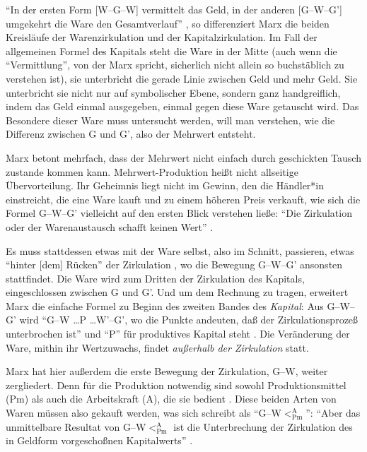 \documentclass[12pt,
               paper=a4,
               twoside=false,
               onehalfspacing,
               bibliography=totoc,
               toc=graduated,
               ]{scrartcl}
\newcommand{\pc}[2]{\parencite[#1]{#2}}
\newcommand{\vgl}[2]{\parencite[vgl.][#1]{#2}}
\newcommand{\gwg}{G--W--G'\xspace}
\newcommand{\gwapm}{G--W$<^{\text{A}}_{\text{Pm}}$\xspace}
\begin{document}

"`In der ersten Form [W--G--W] vermittelt das Geld, in der anderen
[G--W--G'] umgekehrt die Ware den Gesamtverlauf"' \pc{163}{kap}, so
differenziert Marx die beiden Kreisläufe der Warenzirkulation und der
Kapitalzirkulation. Im Fall der allgemeinen Formel des Kapitals steht
die Ware in der Mitte (auch wenn die "`Vermittlung"', von der Marx
spricht, sicherlich nicht allein so buchstäblich zu verstehen ist), sie
unterbricht die gerade Linie zwischen Geld und mehr Geld. Sie
unterbricht sie nicht nur auf symbolischer Ebene, sondern ganz
handgreiflich, indem das Geld einmal ausgegeben, einmal gegen diese
Ware getauscht wird. Das Besondere dieser Ware muss untersucht werden,
will man verstehen, wie die Differenz zwischen G und G', also der
Mehrwert entsteht.


Marx betont mehrfach, dass der Mehrwert nicht einfach durch
geschickten Tausch zustande kommen kann. Mehrwert-Produktion heißt
nicht allseitige Übervorteilung. Ihr Geheimnis liegt nicht im Gewinn,
den die Händler*in einstreicht, die eine Ware kauft und zu einem
höheren Preis verkauft, wie sich die Formel \gwg vielleicht auf den
ersten Blick verstehen ließe: "`Die Zirkulation oder der
Warenaustausch schafft keinen Wert"' \pc{178}{kap}.


Es muss stattdessen etwas mit der Ware selbst, also im Schnitt,
passieren, etwas "`hinter [dem] Rücken"' der Zirkulation
\pc{181}{kap}, wo die Bewegung \gwg ansonsten stattfindet. Die Ware
wird zum Dritten der Zirkulation des Kapitals, eingeschlossen zwischen
G und G'. Und um dem Rechnung zu tragen, erweitert Marx die einfache
Formel zu Beginn des zweiten Bandes des \emph{Kapital}: Aus \gwg wird
"`G--W \dots P \dots W'--G', wo die Punkte andeuten, daß der
Zirkulationsprozeß unterbrochen ist"' \pc{31}{kap2} und "`P"' für
produktives Kapital steht \vgl{34}{kap2}. Die Veränderung der Ware,
mithin ihr Wertzuwachs, findet \emph{außerhalb der Zirkulation} statt.


Marx hat hier außerdem die erste Bewegung der Zirkulation, G--W,
weiter zergliedert. Denn für die Produktion notwendig sind sowohl
Produktionsmittel (Pm) als auch die Arbeitskraft (A), die sie bedient
\vgl{32}{kap2}. Diese beiden Arten von Waren müssen also gekauft
werden, was sich schreibt als "`G--W$<^{\text{A}}_{\text{Pm}}$"':
"`Aber das unmittelbare Resultat von \gwapm ist die Unterbrechung der
Zirkulation des in Geldform vorgeschoßnen Kapitalwerts"'
\pc{40}{kap2}.
\end{document}
